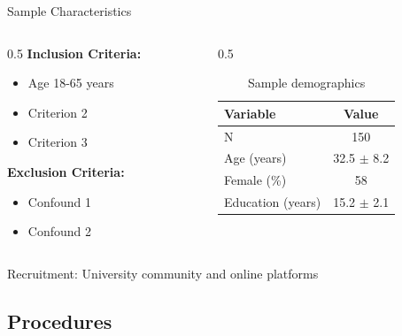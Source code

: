 \documentclass[aspectratio=169,11pt]{beamer}
\begin{document}
\begin{frame}{Sample Characteristics}
  \begin{columns}[T]
    
    \begin{column}{0.5\textwidth}
      \textbf{Inclusion Criteria:}
      \begin{itemize}
        \item Age 18-65 years
        \item Criterion 2
        \item Criterion 3
      \end{itemize}
      
      \vspace{0.3cm}
      
      \textbf{Exclusion Criteria:}
      \begin{itemize}
        \item Confound 1
        \item Confound 2
      \end{itemize}
    \end{column}
    
    \begin{column}{0.5\textwidth}
      \begin{table}
        \centering
        \caption{Sample demographics}
        \small
        \begin{tabular}{lc}
          \toprule
          \textbf{Variable} & \textbf{Value} \\
          \midrule
          N & 150 \\
          Age (years) & 32.5 $\pm$ 8.2 \\
          Female (\%) & 58 \\
          Education (years) & 15.2 $\pm$ 2.1 \\
          \bottomrule
        \end{tabular}
      \end{table}
    \end{column}
    
  \end{columns}
  
  \vspace{0.3cm}
  
  \footnotesize Recruitment: University community and online platforms
\end{frame}

\subsection{Procedures}
\end{document}
